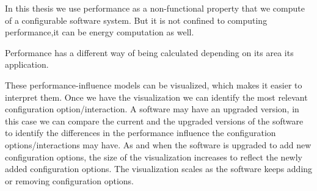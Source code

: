 In this thesis we use performance as a non-functional property that we compute of a configurable software system. But it is not confined to computing performance,it can be energy computation as well.

Performance has a different way of being calculated depending on its area its application.

These performance-influence models can be visualized, which makes it easier to interpret them. Once we have the visualization we can identify the most relevant configuration option/interaction.
A software may have an upgraded version, in this case we can compare the current and the upgraded versions of the software to identify the differences in the performance influence the configuration options/interactions may have.
As and when the software is upgraded to add new configuration options, the size of the visualization increases to reflect the newly added configuration options. The visualization scales as the software keeps adding or removing configuration options.
                                                                       


	